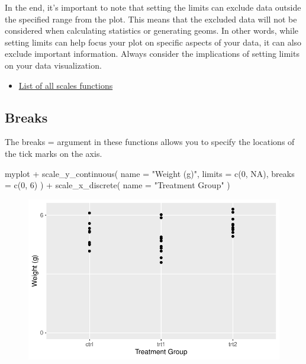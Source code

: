 \documentclass[
  letterpaper,
  DIV=11,
  numbers=noendperiod]{scrartcl}
\newenvironment{Shaded}{\begin{snugshade}}{\end{snugshade}}
\newcommand{\AttributeTok}[1]{\textcolor[rgb]{0.40,0.45,0.13}{#1}}
\newcommand{\ConstantTok}[1]{\textcolor[rgb]{0.56,0.35,0.01}{#1}}
\newcommand{\DecValTok}[1]{\textcolor[rgb]{0.68,0.00,0.00}{#1}}
\newcommand{\FunctionTok}[1]{\textcolor[rgb]{0.28,0.35,0.67}{#1}}
\newcommand{\NormalTok}[1]{\textcolor[rgb]{0.00,0.23,0.31}{#1}}
\newcommand{\SpecialCharTok}[1]{\textcolor[rgb]{0.37,0.37,0.37}{#1}}
\newcommand{\StringTok}[1]{\textcolor[rgb]{0.13,0.47,0.30}{#1}}
\providecommand{\tightlist}{%
  \setlength{\itemsep}{0pt}\setlength{\parskip}{0pt}}\usepackage{longtable,booktabs,array}
\begin{document}
In the end, it's important to note that setting the limits can exclude
data outside the specified range from the plot. This means that the
excluded data will not be considered when calculating statistics or
generating geoms. In other words, while setting limits can help focus
your plot on specific aspects of your data, it can also exclude
important information. Always consider the implications of setting
limits on your data visualization.

\begin{itemize}
\tightlist
\item
  \href{https://ggplot2.tidyverse.org/reference/index.html\#scales}{List
  of all scales functions}
\end{itemize}

\hypertarget{breaks}{%
\subsection{Breaks}\label{breaks}}

The breaks = argument in these functions allows you to specify the
locations of the tick marks on the axis.

\begin{Shaded}
\begin{Highlighting}[]
\NormalTok{myplot }\SpecialCharTok{+}
  \FunctionTok{scale\_y\_continuous}\NormalTok{(}
    \AttributeTok{name =} \StringTok{"Weight (g)"}\NormalTok{,}
    \AttributeTok{limits =} \FunctionTok{c}\NormalTok{(}\DecValTok{0}\NormalTok{, }\ConstantTok{NA}\NormalTok{),}
    \AttributeTok{breaks =} \FunctionTok{c}\NormalTok{(}\DecValTok{0}\NormalTok{, }\DecValTok{6}\NormalTok{)}
\NormalTok{  ) }\SpecialCharTok{+}
  \FunctionTok{scale\_x\_discrete}\NormalTok{(}
    \AttributeTok{name =} \StringTok{"Treatment Group"}
\NormalTok{  )}
\end{Highlighting}
\end{Shaded}

\begin{figure}[H]

{\centering \includegraphics{ggplot2intro_files/figure-pdf/unnamed-chunk-10-1.pdf}

}

\end{figure}
\end{document}

